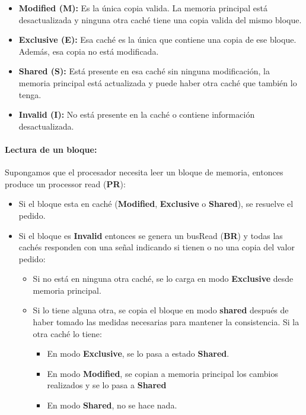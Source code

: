 \begin{itemize}
	\item \textbf{Modified (M):} Es la única copia valida. La memoria principal está desactualizada y ninguna otra caché tiene una copia valida del mismo bloque.
	\item \textbf{Exclusive (E):} Esa caché es la única que contiene una copia de ese bloque. Además, esa copia no está modificada.
	\item \textbf{Shared (S):} Está presente en esa caché sin ninguna modificación, la memoria principal está actualizada y puede haber otra caché que también lo tenga.
	\item \textbf{Invalid (I):} No está presente en la caché o contiene información desactualizada.
\end{itemize}

\paragraph{Lectura de un bloque:}
Supongamos que el procesador necesita leer un bloque de memoria, entonces produce un processor read (\textbf{PR}):
\begin{itemize}
	\item Si el bloque esta en caché (\textbf{Modified}, \textbf{Exclusive} o \textbf{Shared}), se resuelve el pedido.
	\item Si el bloque es \textbf{Invalid} entonces se genera un busRead (\textbf{BR}) y todas las cachés responden con una señal indicando si tienen o no una copia del valor pedido:
	\begin{itemize}
		\item Si no está en ninguna otra caché, se lo carga en modo \textbf{Exclusive} desde memoria principal.
		\item Si lo tiene alguna otra, se copia el bloque en modo \textbf{shared} después de haber tomado las medidas necesarias para mantener la consistencia. Si la otra caché lo tiene:
		\begin{itemize}
			\item En modo \textbf{Exclusive}, se lo pasa a estado \textbf{Shared}.
			\item En modo \textbf{Modified}, se copian a memoria principal los cambios realizados y se lo pasa a \textbf{Shared}
			\item En modo \textbf{Shared}, no se hace nada.
		\end{itemize}
	\end{itemize}
\end{itemize}


